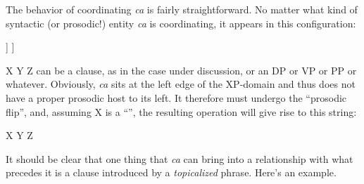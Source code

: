 \documentclass[output=paper,
modfonts
]{LSP/langsci}
\begin{document}
The behavior of coordinating \textit{ca} is fairly straightforward. No matter what kind of syntactic (or prosodic!)
entity \textit{ca} is coordinating,
it appears in this configuration:

\begin{exe}
\ex\begin{forest}
	[XP
		[\textit{ca}]
		[XP
			[{X Y Z}, roof]
		]
	]
\end{forest}
\end{exe}


\noindent {\ob}X Y Z{\cb} can be a clause, as in the case under discussion, or an DP or VP or PP or whatever. Obviously, \textit{ca} sits
at the left edge of the XP-domain and thus does not have a proper prosodic host to its left. It therefore must undergo
the ``prosodic flip'', and, assuming X is a ``'', the resulting operation will give rise to this
string:

\begin{exe}
	\ex
{\textcolor{gray}{{}} X {}} Y Z 
%
\end{exe}

\noindent It should be clear that one thing that \textit{ca} can bring into a  relationship with what precedes it
is a clause introduced by a \textit{topicalized} phrase. Here's an example.

\end{document}

